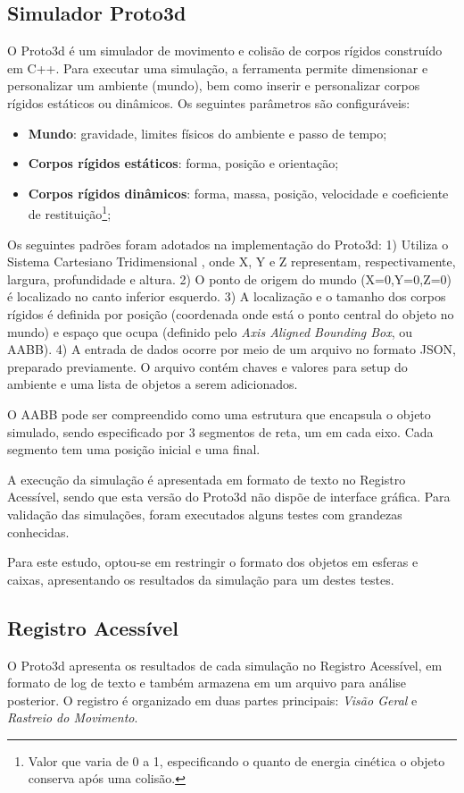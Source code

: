 \documentclass[12pt]{article}
\begin{document}
\subsection{Simulador Proto3d}
O Proto3d é um simulador de movimento e colisão de corpos rígidos construído em C++. Para executar uma simulação, a ferramenta permite dimensionar e personalizar um ambiente (mundo), bem como inserir e personalizar corpos rígidos estáticos ou dinâmicos. Os seguintes parâmetros são configuráveis:
\begin{itemize}
	\item \textbf{Mundo}: gravidade, limites físicos do ambiente e passo de tempo;
	\item \textbf{Corpos rígidos estáticos}: forma, posição e orientação;
	\item \textbf{Corpos rígidos dinâmicos}: forma, massa, posição, velocidade e coeficiente de restituição\footnote{Valor que varia de 0 a 1, especificando o quanto de energia cinética o objeto conserva após uma colisão.};
\end{itemize}
%
Os seguintes padrões foram adotados na implementação do Proto3d: 1) Utiliza o Sistema Cartesiano Tridimensional \cite{thibaut2004proyecto}, onde X, Y e Z representam, respectivamente, largura, profundidade e altura. 2) O ponto de origem do mundo (X=0,Y=0,Z=0) é localizado no canto inferior esquerdo. 3) A localização e o tamanho dos corpos rígidos é definida por posição (coordenada onde está o ponto central do objeto no mundo) e espaço que ocupa (definido pelo \textit{Axis Aligned Bounding Box}, ou AABB). 4) A entrada de dados ocorre por meio de um arquivo no formato JSON, preparado previamente. O arquivo contém chaves e valores para setup do ambiente e uma lista de objetos a serem adicionados.


O AABB pode ser compreendido como uma estrutura que encapsula o objeto simulado, sendo especificado por 3 segmentos de reta, um em cada eixo. Cada segmento tem uma posição inicial e uma final.

A execução da simulação é apresentada em formato de texto no Registro Acessível, sendo que esta versão do Proto3d não dispõe de interface gráfica. Para validação das simulações, foram executados alguns testes com grandezas conhecidas. 

Para este estudo, optou-se em restringir o formato dos objetos em esferas e caixas, apresentando os resultados da simulação para um destes testes.

\subsection{Registro Acessível}
O Proto3d apresenta os resultados de cada simulação no Registro Acessível, em formato de log de texto e também armazena em um arquivo para análise posterior. O registro é organizado em duas partes principais: \emph{Visão Geral} e \emph{Rastreio do Movimento}.
\end{document}
